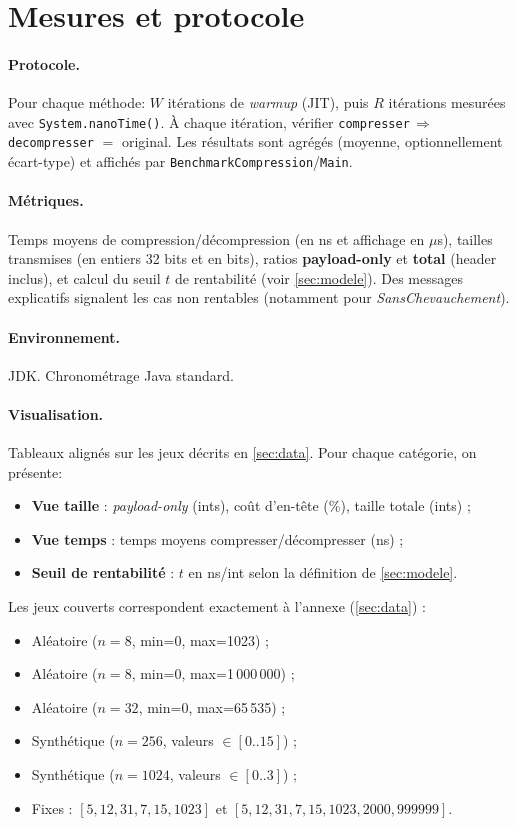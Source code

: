 \section{Mesures et protocole}
\label{sec:mesures}
\paragraph{Protocole.} Pour chaque méthode: $W$ itérations de \emph{warmup} (JIT), puis $R$ itérations mesurées avec \verb|System.nanoTime()|. À chaque itération, vérifier \verb|compresser|\,$\Rightarrow$\,\verb|decompresser| $=$ original. Les résultats sont agrégés (moyenne, optionnellement écart-type) et affichés par \texttt{BenchmarkCompression}/\texttt{Main}.

\paragraph{Métriques.} Temps moyens de compression/décompression (en ns et affichage en $\mu$s), tailles transmises (en entiers 32 bits et en bits), ratios \textbf{payload-only} et \textbf{total} (header inclus), et calcul du seuil $t$ de rentabilité (voir \cref{sec:modele}). Des messages explicatifs signalent les cas non rentables (notamment pour \emph{SansChevauchement}).

\paragraph{Environnement.} JDK. Chronométrage Java standard.

\paragraph{Visualisation.} Tableaux alignés sur les jeux décrits en \cref{sec:data}. Pour chaque catégorie, on présente:
\begin{itemize}
	\item \textbf{Vue taille} : \emph{payload-only} (ints), coût d'en-tête (\%), taille totale (ints) ;
	\item \textbf{Vue temps} : temps moyens compresser/décompresser (ns) ;
	\item \textbf{Seuil de rentabilité} : $t$ en ns/int selon la définition de \cref{sec:modele}.
\end{itemize}
Les jeux couverts correspondent exactement à l'annexe (\cref{sec:data}) :
\begin{itemize}
	\item Aléatoire (\(n=8\), min=0, max=1023) ;
	\item Aléatoire (\(n=8\), min=0, max=1\,000\,000) ;
	\item Aléatoire (\(n=32\), min=0, max=65\,535) ;
	\item Synthétique (\(n=256\), valeurs $\in[0..15]$) ;
	\item Synthétique (\(n=1024\), valeurs $\in[0..3]$) ;
	\item Fixes : $[5,12,31,7,15,1023]$ et $[5,12,31,7,15,1023,2000,999999]$.
\end{itemize}

